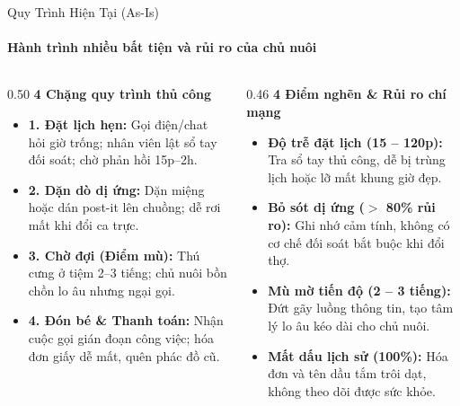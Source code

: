 \begin{frame}{Quy Trình Hiện Tại (As-Is)}
  \framesubtitle{\color{white!90}\textbf{Hành trình nhiều bất tiện và rủi ro của chủ nuôi}}

  \begin{columns}[T]
    \begin{column}{0.50\textwidth}
      {\color{PetcarePrimary}\large \textbf{4 Chặng quy trình thủ công}}\\[2mm]
      \small
      \begin{itemize}
        \setlength\itemsep{2.8mm}
        \item \textbf{1. Đặt lịch hẹn:} Gọi điện/chat hỏi giờ trống; nhân viên lật sổ tay đối soát; chờ phản hồi 15p--2h.
        \item \textbf{2. Dặn dò dị ứng:} Dặn miệng hoặc dán post-it lên chuồng; dễ rơi mất khi đổi ca trực.
        \item \textbf{3. Chờ đợi (Điểm mù):} Thú cưng ở tiệm 2--3 tiếng; chủ nuôi bồn chồn lo âu nhưng ngại gọi.
        \item \textbf{4. Đón bé \& Thanh toán:} Nhận cuộc gọi gián đoạn công việc; hóa đơn giấy dễ mất, quên phác đồ cũ.
      \end{itemize}
    \end{column}

    \begin{column}{0.46\textwidth}
      {\color{PetcarePrimary}\large \textbf{4 Điểm nghẽn \& Rủi ro chí mạng}}\\[2mm]
      \small
      \begin{itemize}
        \setlength\itemsep{2.8mm}
        \item \textbf{Độ trễ đặt lịch (15 -- 120p):} Tra sổ tay thủ công, dễ bị trùng lịch hoặc lỡ mất khung giờ đẹp.
        \item \textbf{Bỏ sót dị ứng ($>$ 80\% rủi ro):} Ghi nhớ cảm tính, không có cơ chế đối soát bắt buộc khi đổi thợ.
        \item \textbf{Mù mờ tiến độ (2 -- 3 tiếng):} Đứt gãy luồng thông tin, tạo tâm lý lo âu kéo dài cho chủ nuôi.
        \item \textbf{Mất dấu lịch sử (100\%):} Hóa đơn và tên dầu tắm trôi dạt, không theo dõi được sức khỏe.
      \end{itemize}
    \end{column}
  \end{columns}
\end{frame}
